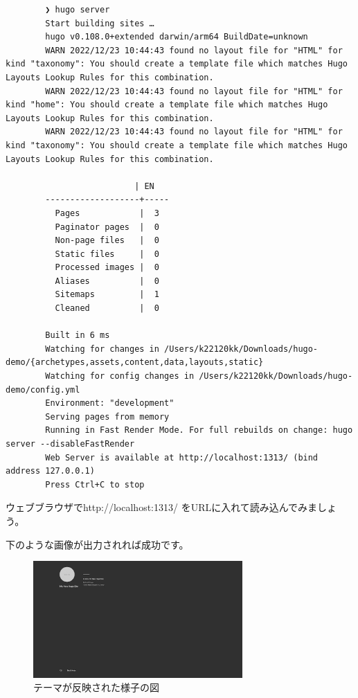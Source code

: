     \begin{shaded}
      \begin{verbatim}
        ❯ hugo server
        Start building sites … 
        hugo v0.108.0+extended darwin/arm64 BuildDate=unknown
        WARN 2022/12/23 10:44:43 found no layout file for "HTML" for kind "taxonomy": You should create a template file which matches Hugo Layouts Lookup Rules for this combination.
        WARN 2022/12/23 10:44:43 found no layout file for "HTML" for kind "home": You should create a template file which matches Hugo Layouts Lookup Rules for this combination.
        WARN 2022/12/23 10:44:43 found no layout file for "HTML" for kind "taxonomy": You should create a template file which matches Hugo Layouts Lookup Rules for this combination.

                          | EN  
        -------------------+-----
          Pages            |  3  
          Paginator pages  |  0  
          Non-page files   |  0  
          Static files     |  0  
          Processed images |  0  
          Aliases          |  0  
          Sitemaps         |  1  
          Cleaned          |  0  

        Built in 6 ms
        Watching for changes in /Users/k22120kk/Downloads/hugo-demo/{archetypes,assets,content,data,layouts,static}
        Watching for config changes in /Users/k22120kk/Downloads/hugo-demo/config.yml
        Environment: "development"
        Serving pages from memory
        Running in Fast Render Mode. For full rebuilds on change: hugo server --disableFastRender
        Web Server is available at http://localhost:1313/ (bind address 127.0.0.1)
        Press Ctrl+C to stop
      \end{verbatim}  
    \end{shaded}

    ウェブブラウザでhttp://localhost:1313/ をURLに入れて読み込んでみましょう。

    下のような画像が出力されれば成功です。

    \begin{figure}[H]
      \centering
      \includegraphics[width=8cm]{./image/02-chap5/output-homepage.png}
      \caption{テーマが反映された様子の図}
      \label{chap5-homepage-image}
    \end{figure}

